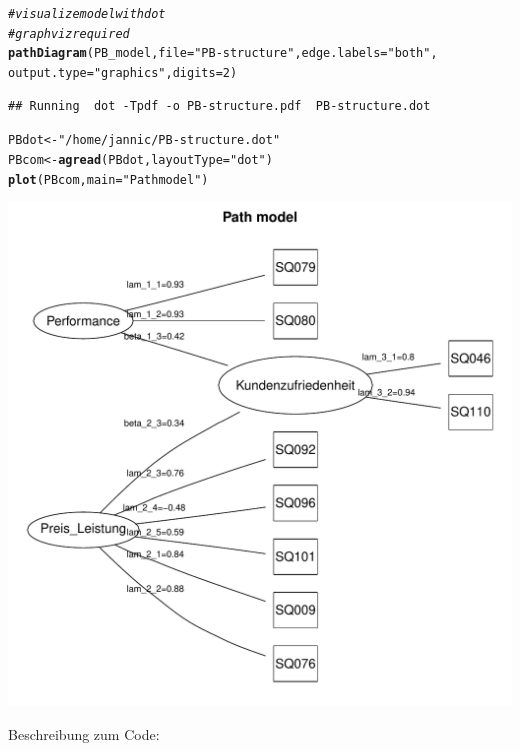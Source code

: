 \documentclass{article}\usepackage[]{graphicx}\usepackage[]{color}
\makeatletter
\def\maxwidth{ %
  \ifdim\Gin@nat@width>\linewidth
    \linewidth
  \else
    \Gin@nat@width
  \fi
}
\newcommand{\hlnum}[1]{\textcolor[rgb]{0.686,0.059,0.569}{#1}}%
\newcommand{\hlstr}[1]{\textcolor[rgb]{0.192,0.494,0.8}{#1}}%
\newcommand{\hlcom}[1]{\textcolor[rgb]{0.678,0.584,0.686}{\textit{#1}}}%
\newcommand{\hlstd}[1]{\textcolor[rgb]{0.345,0.345,0.345}{#1}}%
\newcommand{\hlkwb}[1]{\textcolor[rgb]{0.69,0.353,0.396}{#1}}%
\newcommand{\hlkwc}[1]{\textcolor[rgb]{0.333,0.667,0.333}{#1}}%
\newcommand{\hlkwd}[1]{\textcolor[rgb]{0.737,0.353,0.396}{\textbf{#1}}}%
\newenvironment{kframe}{%
 \def\at@end@of@kframe{}%
 \ifinner\ifhmode%
  \def\at@end@of@kframe{\end{minipage}}%
  \begin{minipage}{\columnwidth}%
 \fi\fi%
 \def\FrameCommand##1{\hskip\@totalleftmargin \hskip-\fboxsep
 \colorbox{shadecolor}{##1}\hskip-\fboxsep
     \hskip-\linewidth \hskip-\@totalleftmargin \hskip\columnwidth}%
 \MakeFramed {\advance\hsize-\width
   \@totalleftmargin\z@ \linewidth\hsize
   \@setminipage}}%
 {\par\unskip\endMakeFramed%
 \at@end@of@kframe}
\newenvironment{knitrout}{}{} %
\makeatother
\begin{document}
\begin{knitrout}
\begin{kframe}
\begin{alltt}
\hlcom{#visualize model with dot }
\hlcom{#graphviz required}
\hlkwd{pathDiagram}\hlstd{(PB_model,} \hlkwc{file} \hlstd{=} \hlstr{"PB-structure"}\hlstd{,} \hlkwc{edge.labels} \hlstd{=} \hlstr{"both"}\hlstd{,}
           \hlkwc{output.type} \hlstd{=} \hlstr{"graphics"}\hlstd{,} \hlkwc{digits} \hlstd{=} \hlnum{2}\hlstd{)}
\end{alltt}
\begin{verbatim}
## Running  dot -Tpdf -o PB-structure.pdf  PB-structure.dot
\end{verbatim}
\begin{alltt}
\hlstd{PBdot} \hlkwb{<-} \hlstr{"/home/jannic/PB-structure.dot"}
\hlstd{PBcom} \hlkwb{<-} \hlkwd{agread}\hlstd{(PBdot,} \hlkwc{layoutType}\hlstd{=}\hlstr{"dot"}\hlstd{)}
\hlkwd{plot}\hlstd{(PBcom,} \hlkwc{main}\hlstd{=}\hlstr{"Path model"}\hlstd{)}
\end{alltt}
\end{kframe}
\includegraphics[width=\maxwidth]{figure/semPLS2} 

\end{knitrout}
Beschreibung zum Code:\\
\end{document}
